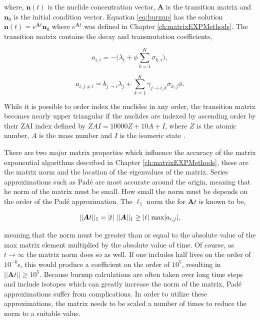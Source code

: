\noindent where, $\boldsymbol{n}(t)$ is the nuclide concentration vector, $\boldsymbol{A}$ is the transition matrix and $\boldsymbol{n}_{0}$ is the initial condition vector. Equation \ref{eq:burnup} has the solution $\boldsymbol{n}(t) = e^{\boldsymbol{A}t}\boldsymbol{n}_{0}$ where $e^{\boldsymbol{A}t}$ was defined in Chapter \ref{ch:matrixEXPMethods}. The transition matrix contains the decay and transmutation coefficients, 

\begin{equation}
    a_{i,i} = -\bigg(\lambda_{i} + \phi\sum_{k=1}^{K} \sigma_{k,i}\bigg),
    \label{eq:diagonalCoeffsTraditionalBurnup}
\end{equation}

\begin{equation}
    a_{i,j\neq i} = b_{j\rightarrow i}\lambda_{j} + 
    \sum_{k=1}^{K}\gamma_{j\rightarrow i,k}\sigma_{k,j}\phi.
    \label{eq:offdiagonalCoeffsTraditionalBurnup}
\end{equation}

\noindent While it is possible to order index the nuclides in any order, the transition matrix becomes nearly upper triangular if the nuclides are indexed by ascending order by their ZAI index defined by $ZAI = 10000Z + 10A + I$, where $Z$ is the atomic number, $A$ is the mass number and $I$ is the isomeric state \cite{pusa2013}.

There are two major matrix properties which influence the accuracy of the matrix exponential algorithms described in Chapter \ref{ch:matrixEXPMethods}, these are the matrix norm and the location of the eigenvalues of the matrix. Series approximations such as Pad\'e are most accurate around the origin, meaning that he norm of the matrix must be small. How small the norm must be depends on the order of the Pad\'e approximation. The $\ell_{1}$ norm the for $\boldsymbol{A}t$ is known to be,

\begin{equation}
    ||\boldsymbol{A}t||_{1} = |t|\hspace{1mm}||\boldsymbol{A}||_{1} \geq |t|\hspace{1mm}\text{max}|a_{i,j}|, 
\end{equation}

\noindent meaning that the norm must be greater than or equal to the absolute value of the max matrix element multiplied by the absolute value of time. Of course, as $t \rightarrow \infty$ the matrix norm does so as well. If one includes half lives on the order of $10^{-6}$s, this would produce a coefficient on the order of $10^{5}$, resulting in $||\boldsymbol{A}t|| \geq 10^{5}$. Because burnup calculations are often taken over long time steps and include isotopes which can greatly increase the norm of the matrix, Pad\'e approximations suffer from complications. In order to utilize these approximations, the matrix needs to be scaled a number of times to reduce the norm to a suitable value. 

